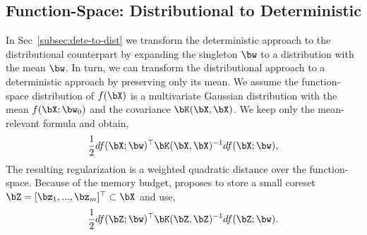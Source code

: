 \subsection{Function-Space: Distributional to Deterministic}
In Sec~\ref{subsec:dete-to-dist} we transform the deterministic approach to the distributional counterpart by expanding the singleton $\bw$ to a distribution with the mean $\bw$. In turn, we can transform the distributional approach to a deterministic approach by preserving only its mean. We assume the function-space distribution of $f(\bX)$ is a multivariate Gaussian distribution with the mean $f(\bX; \bw_0)$ and the covariance $\bK(\bX, \bX)$. We keep only the mean-relevant formula and obtain,
\begin{align}
    \frac{1}{2}df(\bX; \bw)^{\top} \bK(\bX, \bX)^{-1} df(\bX; \bw),
\end{align}
The resulting regularization is a weighted quadratic distance over the function-space. Because of the memory budget, \citet{pan2020continual} proposes to store a small coreset $\bZ = [\bz_1, ..., \bz_m]^{\top} \subset \bX$ and use,
\begin{align}
    \frac{1}{2}df(\bZ; \bw)^{\top} \bK(\bZ, \bZ)^{-1} df(\bZ; \bw).
\end{align}


%


